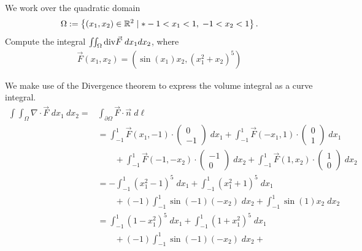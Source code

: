\documentclass[11pt]{article}
\begin{document}
\begin{exercise}
    We work over the quadratic domain 
    \begin{gather*}
        \Omega := \left\{ (x_1,x_2) \in \bbR^{2} \suchthat* -1 < x_1 < 1, \; -1 < x_2 < 1 \right\}.
    \end{gather*}
    Compute the integral $\iint_\Omega \mathrm{div} \vec F \;dx_1dx_2$, where 
    \begin{gather*}
        \vec F(x_1,x_2) = \left( \sin(x_1) x_2, \left( x_1^2 + x_2 \right)^5 \right)
    \end{gather*}
\end{exercise}
\begin{solution}
    We make use of the Divergence theorem to express the volume integral as a curve integral.
    \begin{align*}
        \int \int_{\Omega} \nabla \cdot \vec{F} \;d x_1 \:d x_2 
        =
        &
        \int_{\partial \Omega}\vec{F}\cdot\vec{n} \;d\ell
        \\&=
        \int_{-1}^1 \vec{F}( x_1,  -1)\cdot\begin{pmatrix}0\\-1\end{pmatrix} \;dx_1 
        + 
        \int_{-1}^1 \vec{F}(-x_1,   1)\cdot\begin{pmatrix}0\\1\end{pmatrix} \;dx_1
        \\&\qquad 
        + 
        \int_{-1}^1 \vec{F}(  -1,-x_2)\cdot\begin{pmatrix}-1\\0\end{pmatrix} \;dx_2 
        + 
        \int_{-1}^1 \vec{F}(   1, x_2)\cdot\begin{pmatrix}1\\0\end{pmatrix} \;dx_2
        \\&=
        -\int_{-1}^1 (x_1^ 2-1)^ 5 \;dx_1 
        + 
        \int_{-1}^1 (x_1^2 + 1)^ 5 \;dx_1 
        \\&\qquad 
        + 
        (-1)\int_{-1}^1 \sin(-1)(-x_2)\;dx_2
        +
        \int_{-1}^1 \sin(1)x_2\;dx_2
        \\&=
        \int_{-1}^1 (1-x_1^2)^ 5 \;dx_1 
        + 
        \int_{-1}^1 (1+x_1^2)^ 5 \;dx_1 
        \\&\qquad 
        + 
        (-1)\int_{-1}^1 \sin(-1)(-x_2)\;dx_2
        +

\end{align*}
\end{solution}
\end{document}

